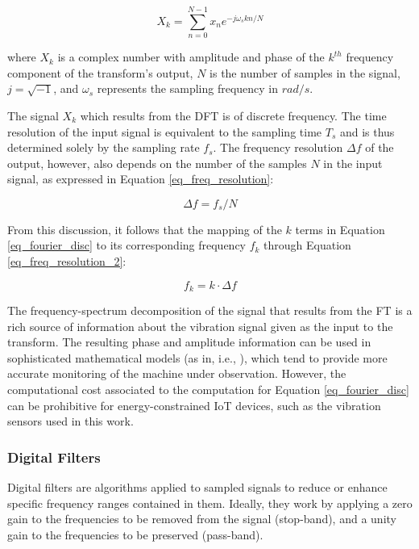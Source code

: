 \documentclass[conference]{IEEEtran}
\begin{document}
\begin{equation}
	\label{eq_fourier_disc}
	X_{k} = \sum_{n = 0}^{N-1} x_{n}e^{-j \omega_{s} kn/N}
\end{equation}

where $X_{k}$ is a complex number with amplitude and phase of the $k^{th}$ frequency component of the transform's output, $N$ is the number of samples in the signal, $j=\sqrt{-1}$, and $\omega_{s}$ represents the sampling frequency in $rad/s$.

The signal $X_{k}$  which results from the DFT is of discrete frequency. The time resolution of the input signal is equivalent to the sampling time $T_{s}$ and is thus determined solely by the sampling rate $f_{s}$. The frequency resolution $\Delta f$ of the output, however, also depends on the number of the samples $N$ in the input signal, as expressed in Equation \ref{eq_freq_resolution}:

\begin{equation}
\label{eq_freq_resolution}
\Delta f = f_{s}/N
\end{equation}

From this discussion, it follows that the mapping of the $k$ terms in Equation \ref{eq_fourier_disc} to its corresponding frequency $f_{k}$ through Equation \ref{eq_freq_resolution_2}:

\begin{equation}
\label{eq_freq_resolution_2}
f_{k} = k \cdot \Delta f
\end{equation}

The frequency-spectrum decomposition of the signal that results from the FT is a rich source of information about the vibration signal given as the input to the transform. The resulting phase and amplitude information can be used in sophisticated mathematical models (as in, i.e., \cite{wu2017remaining}), which tend to provide more accurate monitoring of the machine under observation. However, the computational cost associated to the computation for Equation \ref{eq_fourier_disc} can be prohibitive for energy-constrained IoT devices, such as the vibration sensors used in this work. 


\subsubsection{Digital Filters}
\label{sec_digital_filters_concept}
Digital filters are algorithms applied to sampled signals to reduce or enhance specific frequency ranges contained in them. Ideally, they work by applying a zero gain to the frequencies to be removed from the signal (stop-band), and a unity gain to the frequencies to be preserved (pass-band).
\end{document}
